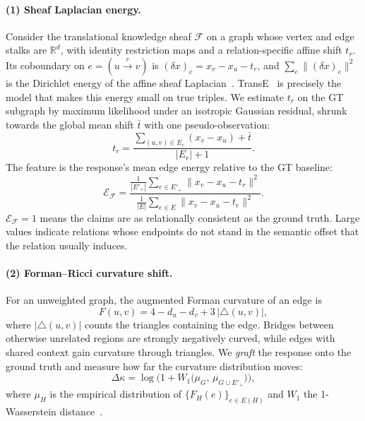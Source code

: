 \documentclass[10pt,twocolumn]{article}
\theoremstyle{remark}
\newcommand{\R}{\mathbb{R}}
\begin{document}
\paragraph{(1) Sheaf Laplacian energy.}
Consider the translational knowledge sheaf $\mathcal F$ on a graph whose vertex and edge stalks are $\R^d$, with
identity restriction maps and a relation-specific affine shift $t_r$. Its coboundary on $e=(u\xrightarrow{r}v)$ is
$(\delta x)_e=x_v-x_u-t_r$, and $\sum_e\|(\delta x)_e\|^2$ is the Dirichlet energy of the affine sheaf
Laplacian~\cite{hansen2019sheaves,gebhart2023knowledge}. TransE~\cite{bordes2013transe} is precisely the model that
makes this energy small on true triples. We estimate $t_r$ on the GT subgraph by maximum likelihood under an
isotropic Gaussian residual, shrunk towards the global mean shift $\bar t$ with one pseudo-observation:
\begin{equation}
t_r=\frac{\sum_{(u,v)\in E_r}(x_v-x_u)+\bar t}{|E_r|+1}.
\end{equation}
The feature is the response's mean edge energy relative to the GT baseline:
\begin{equation}
\mathcal E_{\mathcal F}=\frac{\frac1{|E'_+|}\sum_{e\in E'_+}\|x_v-x_u-t_r\|^2}{\frac1{|E|}\sum_{e\in E}\|x_v-x_u-t_r\|^2}.
\end{equation}
$\mathcal E_{\mathcal F}=1$ means the claims are as relationally consistent as the ground truth. Large values indicate
relations whose endpoints do not stand in the semantic offset that the relation usually induces.

\paragraph{(2) Forman--Ricci curvature shift.}
For an unweighted graph, the augmented Forman curvature of an edge is~\cite{samal2018comparative}
\begin{equation}
F(u,v)=4-d_u-d_v+3\,|\triangle(u,v)|,
\end{equation}
where $|\triangle(u,v)|$ counts the triangles containing the edge. Bridges between otherwise unrelated regions are
strongly negatively curved, while edges with shared context gain curvature through triangles. We \emph{graft} the
response onto the ground truth and measure how far the curvature distribution moves:
\begin{equation}
\Delta\kappa=\log\Big(1+W_1\big(\mu_{G},\,\mu_{G\cup E'_+}\big)\Big),
\end{equation}
where $\mu_H$ is the empirical distribution of $\{F_H(e)\}_{e\in E(H)}$ and $W_1$ the 1-Wasserstein
distance~\cite{villani2009optimal}.
\end{document}
